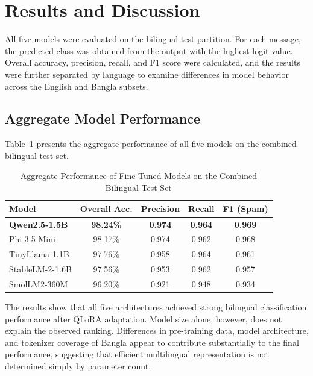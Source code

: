 \documentclass[journal]{IEEEtran}
\begin{document}
\section{Results and Discussion}

All five models were evaluated on the bilingual test partition. For each message, the predicted class was obtained from the output with the highest logit value. Overall accuracy, precision, recall, and F1 score were calculated, and the results were further separated by language to examine differences in model behavior across the English and Bangla subsets.

\subsection{Aggregate Model Performance}

Table~\ref{tab:aggregate_results} presents the aggregate performance of all five models on the combined bilingual test set.

\begin{table}[htbp]
\caption{Aggregate Performance of Fine-Tuned Models on the Combined Bilingual Test Set}
\label{tab:aggregate_results}
\centering
\begin{tabular}{lcccc}
\toprule
\textbf{Model} & \textbf{Overall Acc.} & \textbf{Precision} & \textbf{Recall} & \textbf{F1 (Spam)} \\
\midrule
\rowcolor{gray!20} \textbf{Qwen2.5-1.5B} & \textbf{98.24\%} & \textbf{0.974} & \textbf{0.964} & \textbf{0.969} \\
Phi-3.5 Mini & 98.17\% & 0.974 & 0.962 & 0.968 \\
TinyLlama-1.1B & 97.76\% & 0.958 & 0.964 & 0.961 \\
StableLM-2-1.6B & 97.56\% & 0.953 & 0.962 & 0.957 \\
SmolLM2-360M & 96.20\% & 0.921 & 0.948 & 0.934 \\
\bottomrule
\end{tabular}
\end{table}



The results show that all five architectures achieved strong bilingual classification performance after QLoRA adaptation. Model size alone, however, does not explain the observed ranking. Differences in pre-training data, model architecture, and tokenizer coverage of Bangla appear to contribute substantially to the final performance, suggesting that efficient multilingual representation is not determined simply by parameter count.
\end{document}
